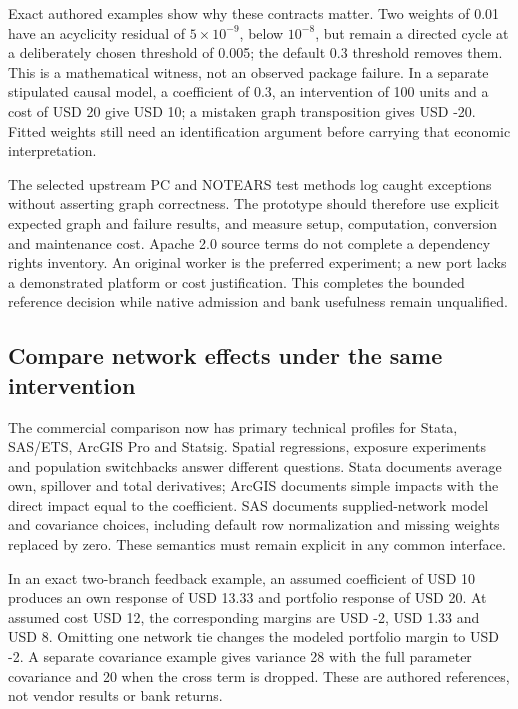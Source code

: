 Exact authored examples show why these contracts matter. Two weights of
0.01 have an acyclicity residual of \(5\times10^{-9}\), below
\(10^{-8}\), but remain a directed cycle at a deliberately chosen
threshold of 0.005; the default 0.3 threshold removes them. This is a
mathematical witness, not an observed package failure. In a separate
stipulated causal model, a coefficient of 0.3, an intervention of 100
units and a cost of USD 20 give USD 10; a mistaken graph transposition
gives USD -20. Fitted weights still need an identification argument
before carrying that economic interpretation.
\citep{exec20_gcastle_reference}

The selected upstream PC and NOTEARS test methods log caught exceptions
without asserting graph correctness. The prototype should therefore use
explicit expected graph and failure results, and measure setup,
computation, conversion and maintenance cost. Apache 2.0 source terms do
not complete a dependency rights inventory. An original worker is the
preferred experiment; a new port lacks a demonstrated platform or cost
justification. This completes the bounded reference decision while
native admission and bank usefulness remain unqualified.
\citep{exec20_gcastle_source}

\hypertarget{compare-network-effects-under-the-same-intervention}{%
\subsection{Compare network effects under the same
intervention}\label{compare-network-effects-under-the-same-intervention}}

The commercial comparison now has primary technical profiles for Stata,
SAS/ETS, ArcGIS Pro and Statsig. Spatial regressions, exposure
experiments and population switchbacks answer different questions. Stata
documents average own, spillover and total derivatives; ArcGIS documents
simple impacts with the direct impact equal to the coefficient. SAS
documents supplied-network model and covariance choices, including
default row normalization and missing weights replaced by zero. These
semantics must remain explicit in any common interface.
\citep{exec20_network_stata_spregress,exec20_network_stata_impacts,exec20_network_stata_panel,exec20_network_sas_latest_spatial,exec20_network_arcgis_method,exec20_network_arcgis_tool}

In an exact two-branch feedback example, an assumed coefficient of USD
10 produces an own response of USD 13.33 and portfolio response of USD
20. At assumed cost USD 12, the corresponding margins are USD -2, USD
1.33 and USD 8. Omitting one network tie changes the modeled portfolio
margin to USD -2. A separate covariance example gives variance 28 with
the full parameter covariance and 20 when the cross term is dropped.
These are authored references, not vendor results or bank returns.
\citep{exec20_network_reference}

